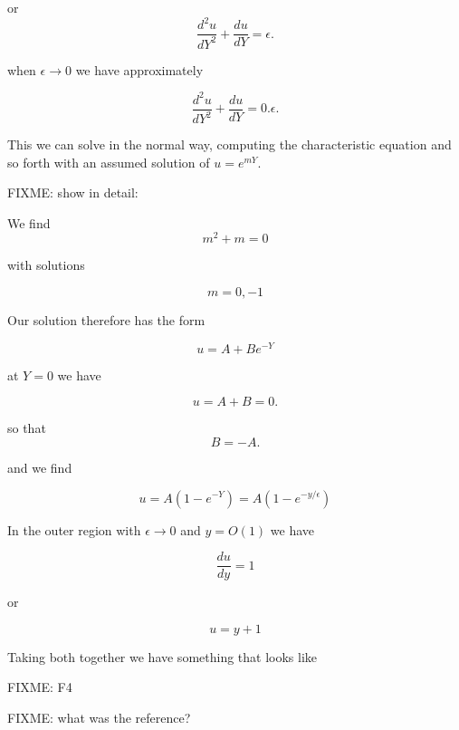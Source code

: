 or
\begin{equation}\label{eqn:continuumL20:n}
\frac{d^2 u}{dY^2} + \frac{du}{dY} = \epsilon.
\end{equation}

when $\epsilon \rightarrow 0$ we have approximately

\begin{equation}\label{eqn:continuumL20:n}
\frac{d^2 u}{dY^2} + \frac{du}{dY} = 0.
\epsilon.
\end{equation}

This we can solve in the normal way, computing the characteristic equation and so forth with an assumed solution of $u = e^{mY}$.

FIXME: show in detail:

We find
\begin{equation}\label{eqn:continuumL20:n}
m^2 + m = 0
\end{equation}

with solutions

\begin{equation}\label{eqn:continuumL20:n}
m = 0, -1
\end{equation}

Our solution therefore has the form

\begin{equation}\label{eqn:continuumL20:n}
u = A + B e^{-Y}
\end{equation}

at $Y = 0$ we have

\begin{equation}\label{eqn:continuumL20:n}
u = A + B = 0.
\end{equation}

so that 
\begin{equation}\label{eqn:continuumL20:n}
B = -A.
\end{equation}

and we find

\begin{equation}\label{eqn:continuumL20:n}
u = A (1 - e^{-Y}) = A( 1 - e^{-y/\epsilon} )
\end{equation}

In the outer region with $\epsilon \rightarrow 0$ and $y = O(1)$ we have

\begin{equation}\label{eqn:continuumL20:n}
\frac{du}{dy} = 1
\end{equation}

or 

\begin{equation}\label{eqn:continuumL20:n}
u = y + 1
\end{equation}

Taking both together we have something that looks like

FIXME: F4


FIXME: what was the reference?

\EndNoBibArticle
